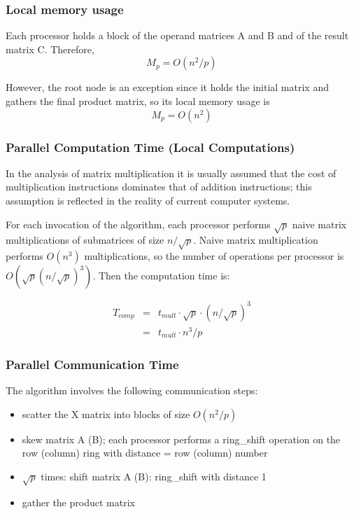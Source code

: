 \documentclass{article}
\begin{document}
\subsubsection{Local memory usage}

Each processor holds a block of the operand matrices A and B and of the result
matrix C. Therefore, $$M_p = O(n^2/p)$$

However, the root node is an exception
since it holds the initial matrix and gathers the final product matrix, so its
local memory usage is $$M_p = O(n^2)$$

\subsubsection{Parallel Computation Time (Local Computations)}

In the analysis of matrix multiplication it is usually assumed that the cost of
multiplication instructions dominates that of addition instructions; this
assumption is reflected in the reality of current computer systems.

For each invocation of the algorithm, each processor performs $\sqrt{p}$ naive
matrix multiplications of submatrices of size $n/\sqrt{p}$. Naive matrix
multiplication performs $O(n^3)$ multiplications, so the number of operations
per processor is $O(\sqrt{p}(n/\sqrt{p})^3)$. Then the computation time is: 

\begin{eqnarray*}
T_{{comp}} 	&=& t_{{mult}} \cdot \sqrt{p} \cdot (n/\sqrt{p})^3 \\ 
			&=& t_{{mult}} \cdot n^3 / p
\end{eqnarray*}

\subsubsection{Parallel Communication Time}

The algorithm involves the following communication steps:
\begin{itemize}
	\item scatter the X matrix into blocks of size $O(n^2/p)$
	\item skew matrix A (B); each processor performs a ring\_shift operation on
	the row (column) ring with distance = row (column) number
	\item $\sqrt{p}$ times: shift matrix A (B): ring\_shift with distance 1
	\item gather the product matrix
\end{itemize}
\end{document}
